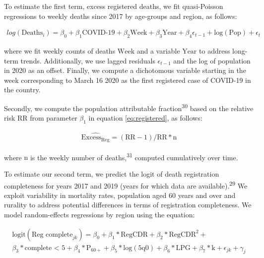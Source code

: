 \documentclass[
]{article}
\begin{document}
To estimate the first term, excess registered deaths, we fit quasi-Poisson regressions to weekly deaths since 2017 by age-groups and region, as follows:

\begin{equation}
  \label{eq:registered}
  \begin{aligned}
  log(\text{Deaths}_{i})=\beta_0+\beta_1\text{COVID-19}+\beta_2\text{Week}+\beta_3\text{Year}+
  \beta_4\epsilon_{t-1} + \text{log}(\text{Pop})+\epsilon_{t}
   \end{aligned}  
\end{equation}

where we fit weekly counts of deaths \(\text{Week}\) and a variable \(\text{Year}\) to address long-term trends. Additionally, we use lagged residuals \(\epsilon_{t-1}\) and the log of population in 2020 as an offset. Finally, we compute a dichotomous variable starting in the week corresponding to March 16 2020 as the first registered case of COVID-19 in the country.

Secondly, we compute the population attributable fraction\textsuperscript{30} based on the relative risk \(\text{RR}\) from parameter \(\beta_1\) in equation \eqref{eq:registered}, as follows:

\begin{equation}
\label{eq:rr}
\begin{aligned}
\widehat{{\text{Excess}}_\text{Reg}} = (\text{RR}-1)/\text{RR}*\text{n}
\end{aligned}
\end{equation}

where \(\text{n}\) is the weekly number of deaths,\textsuperscript{31} computed cumulatively over time.

To estimate our second term, we predict the logit of death registration completeness for years 2017 and 2019 (years for which data are available).\textsuperscript{29} We exploit variability in mortality rates, population aged 60 years and over and rurality to address potential differences in terms of registration completeness. We model random-effects regressions by region using the equation:

\begin{equation}
\label{eq:adair}
\begin{aligned}
  \text{logit}(\text{Reg complete}_{jk})=
  \beta_0+
  \beta_1*\text{RegCDR}+
  \beta_2*\text{RegCDR}^2+\\
  \beta_3*\text{complete < 5}+
  \beta_4*\text{P}_{60+}+
  \beta_5*\text{log}(\text{5q0})+ 
  \beta_6*\text{LPG} +
  \beta_7*\text{k}+
  \epsilon_{jk} + 
  \gamma_{j}
\end{aligned}
\end{equation}
\end{document}
